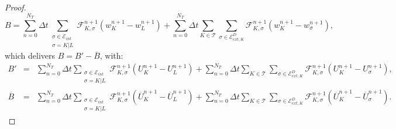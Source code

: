 \documentclass[smallextended]{svjour3}
\begin{document}
\begin{proof}
\begin{equation*}
B = \sum_{n=0}^{N_{T}} \Delta t \sum_{\substack{\sigma \in \mathcal{E}_{int} \\ \sigma=K|L}} \mathcal{F}^{n+1}_{K,\sigma}\left(w^{n+1}_{K}-w_{L}^{n+1}\right) + \sum_{n=0}^{N_{T}} \Delta t \sum_{K \in \mathcal{T}} \sum_{\sigma \in \mathcal{E}_{ext,K}^{D}} \mathcal{F}^{n+1}_{K,\sigma} \left(w^{n+1}_{K}-w_{\sigma}^{n+1}\right),
\end{equation*}
which delivers $B=B'-\overline{B}$, with:
\begin{eqnarray*}
B' &=& \sum_{n=0}^{N_{T}} \Delta t \sum_{\substack{\sigma \in \mathcal{E}_{int} \\ \sigma=K|L}} \mathcal{F}^{n+1}_{K,\sigma}\left(U^{n+1}_{K}-U_{L}^{n+1}\right) + \sum_{n=0}^{N_{T}} \Delta t \sum_{K \in \mathcal{T}} \sum_{\sigma \in \mathcal{E}_{ext,K}^{D}} \mathcal{F}^{n+1}_{K,\sigma}\left(U^{n+1}_{K}-U_{\sigma}^{n+1}\right),\\
\overline{B} &=& \sum_{n=0}^{N_{T}} \Delta t \sum_{\substack{\sigma \in \mathcal{E}_{int} \\ \sigma=K|L}} \mathcal{F}^{n+1}_{K,\sigma}\left(\overline{U}^{n+1}_{K}-\overline{U}_{L}^{n+1}\right) + \sum_{n=0}^{N_{T}} \Delta t \sum_{K \in \mathcal{T}} \sum_{\sigma \in \mathcal{E}_{ext,K}^{D}} \mathcal{F}^{n+1}_{K,\sigma}\left(\overline{U}^{n+1}_{K}-\overline{U}_{\sigma}^{n+1}\right).
\end{eqnarray*}


\end{proof}
\end{document}
